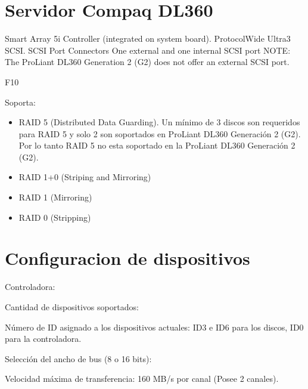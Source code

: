 \documentclass[a4paper]{article}
\begin{document}
\section{Servidor Compaq DL360}
\begin{enumerateabc}
\item Smart Array 5i Controller (integrated on system board).
ProtocolWide Ultra3 SCSI. SCSI Port Connectors One external and one internal SCSI port
NOTE: The ProLiant DL360 Generation 2 (G2) does not offer an external SCSI port.
\item F10
\item {}
\item Soporta: \begin{itemize}
\item RAID 5 (Distributed Data Guarding). Un mínimo de 3 discos son requeridos para RAID 5 y solo 2 son soportados en ProLiant DL360 Generación 2 (G2). Por lo tanto RAID 5 no esta soportado en la ProLiant DL360 Generación 2 (G2).
\item RAID 1+0 (Striping and Mirroring)
\item RAID 1 (Mirroring)
\item RAID 0 (Stripping)
\end{itemize}
\end{enumerateabc}
%
\section{Configuracion de dispositivos}
\begin{enumerateabc}
\item Controladora: 
\item Cantidad de dispositivos soportados: 
\item {}
\item Número de ID asignado a los dispositivos actuales: ID3 e ID6 para los discos, ID0 para la controladora.
\item Selección del ancho de bus (8 o 16 bits): 
\item Velocidad máxima de transferencia: 160 MB/s por canal (Posee 2 canales).
\end{enumerateabc}
%
\end{document}
